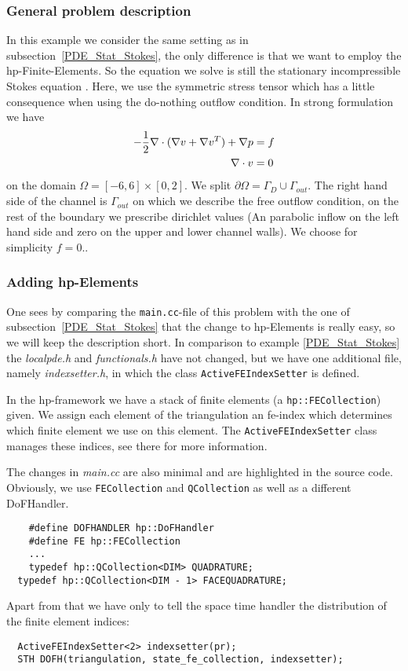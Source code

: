 \subsubsection{General problem description}
In this example we consider the same setting as in subsection~\ref{PDE_Stat_Stokes}, the only
difference is that we want to employ the hp-Finite-Elements. So the equation we solve is still 
the stationary incompressible Stokes equation . Here,
we use the symmetric stress tensor which has a little consequence when using 
the do-nothing outflow condition. In strong formulation we have
\begin{align} 
-\frac{1}{2}\nabla\cdot (\nabla v + \nabla v^{T}) + \nabla p &= f \\ 
\nabla \cdot v &= 0 \notag
\end{align} 
on the domain $\Omega = [-6,6]\times [0,2]$.  We split $\partial \Omega = \Gamma_D \cup \Gamma_{out}$. The right hand side of the channel is $\Gamma_{out}$ on which we describe the free outflow condition, on the rest of the boundary we prescribe dirichlet values (An parabolic inflow on the left hand side and zero on the upper and lower channel walls). We choose for simplicity $f=0$..\\

\subsubsection{Adding hp-Elements}
One sees by comparing  the \texttt{main.cc}-file of this problem with the one of subsection~\ref{PDE_Stat_Stokes} that the change to hp-Elements is really easy, so we will keep the description short. In comparison to example \ref{PDE_Stat_Stokes} the \textit{localpde.h} and \textit{functionals.h} have not changed, but we have one additional file, namely \textit{indexsetter.h}, in which the class \texttt{ActiveFEIndexSetter} is defined.

In the hp-framework we have a stack of finite elements (a \texttt{hp::FECollection}) given. We assign each element of the triangulation an fe-index which determines which finite element we use on this element. The \texttt{ActiveFEIndexSetter} class manages these indices, see there for more information.

The changes in \textit{main.cc} are also minimal and are highlighted in the source code. Obviously, we use \texttt{FECollection} and \texttt{QCollection} as well as a different DoFHandler.
\begin{verbatim}
  	#define DOFHANDLER hp::DoFHandler
  	#define FE hp::FECollection
  	...
  	typedef hp::QCollection<DIM> QUADRATURE;
  typedef hp::QCollection<DIM - 1> FACEQUADRATURE;
\end{verbatim}
Apart from that we have only to tell the space time handler the distribution of the finite element indices:
\begin{verbatim}
  ActiveFEIndexSetter<2> indexsetter(pr);
  STH DOFH(triangulation, state_fe_collection, indexsetter);
\end{verbatim}


